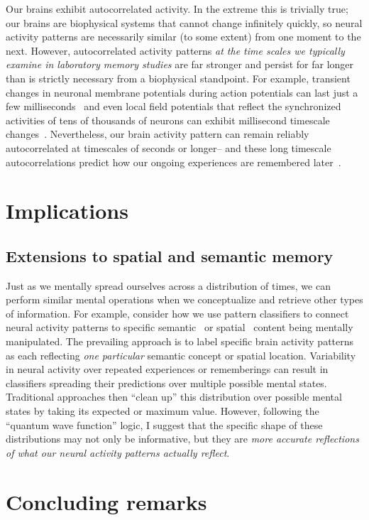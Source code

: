 \documentclass{article}
\begin{document}
Our brains exhibit autocorrelated activity.  In the extreme this is trivially true; our brains are biophysical systems that cannot change infinitely quickly, so neural activity patterns are necessarily similar (to some extent) from one moment to the next.  However, autocorrelated activity patterns \textit{at the time scales we typically examine in laboratory memory studies} are far stronger and persist for far longer than is strictly necessary from a biophysical standpoint.  For example, transient changes in neuronal membrane potentials during action potentials can last just a few milliseconds~\citep{HodgHuxl52} and even local field potentials that reflect the synchronized activities of tens of thousands of neurons can exhibit millisecond timescale changes~\citep{Frie05, Buzs06}.  Nevertheless, our brain activity pattern can remain reliably autocorrelated at timescales of seconds or longer-- and these long timescale autocorrelations predict how our ongoing experiences are remembered later~\citep[e.g.][]{MannEtal07, MannEtal11, HowaEtal12, FolkEtal18}.

\section*{Implications}
\subsection*{Extensions to spatial and semantic memory}
Just as we mentally spread ourselves across a distribution of times, we can perform similar mental operations when we conceptualize and retrieve other types of information.  For example, consider how we use pattern classifiers to connect neural activity patterns to specific semantic~\citep{semantic decoding studies} or spatial~\citep{spatial decoding studies} content being mentally manipulated.  The prevailing approach is to label specific brain activity patterns as each reflecting \textit{one particular} semantic concept or spatial location.  Variability in neural activity over repeated experiences or rememberings can result in classifiers spreading their predictions over multiple possible mental states.  Traditional approaches then ``clean up'' this distribution over possible mental states by taking its expected or maximum value.  However, following the ``quantum wave function'' logic, I suggest that the specific shape of these distributions may not only be informative, but they are \textit{more accurate reflections of what our neural activity patterns actually reflect}.

\section*{Concluding remarks}



\end{document}

